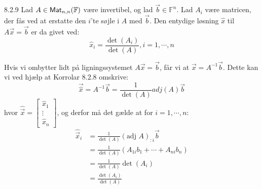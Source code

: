 \begin{korollar}{8.2.9}
	Lad $A \in \textsf{Mat}_{n,n}(\mathbb{F})$ være invertibel, og lad $\vec{b} \in 
	\mathbb{F}^n$.
	Lad $A_i$ være matricen, der fås ved at erstatte den $i$'te søjle i $A$ med
	$\vec{b}$. Den entydige løsning $\hat{x}$ til $A\vec{x} = \vec{b}$ er da 
	givet ved:
	\[
		\hat{x}_i = \frac{\det(A_i)}{\det(A)}, i = 1, \cdots, n
	\]
\end{korollar}

\begin{bevis}
	Hvis vi ombytter lidt på ligningssystemet $A\vec{x} = \vec{b}$, får vi at
	$\vec{x} = A^{-1}\vec{b}$. Dette kan vi ved hjælp at Korrolar 8.2.8 
	omskrive:
	\[
		\vec{\hat{x}} = A^{-1}\vec{b} = \frac{1}{\det(A)}adj(A)\vec{b}
	\]
	hvor $\hat{\vec{x}} = \begin{bmatrix}\hat{x}_1\\ \vdots \\ \hat{x}_n 
	\end{bmatrix}$, og derfor må det gælde at for $i = 1, \cdots, n$:
	\begin{align*}
		\hat{\vec{x}}_i	&= \frac{1}{\det(A)}(\text{adj }A)_{:i}\vec{b}\\
						&= \frac{1}{\det(A)}(A_{1i}b_1 + \cdots + A_{ni}b_n)\\
						&= \frac{1}{\det(A)}\det(A_i)\\
						&= \frac{\det(A_i)}{\det(A)}
	\end{align*}
\end{bevis}
